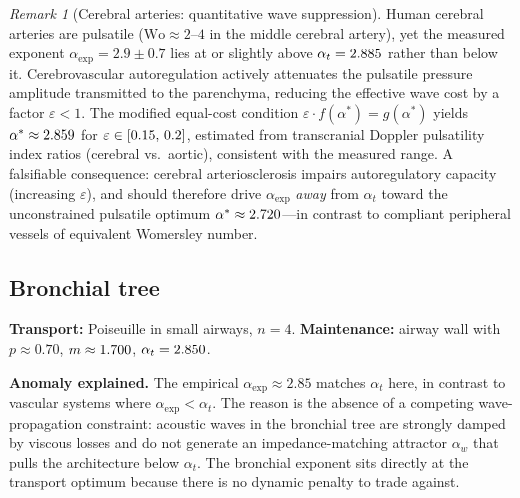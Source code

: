 \documentclass[11pt,a4paper]{article}
\theoremstyle{remark}
\newtheorem{remark}{Remark}
\begin{document}
\begin{remark}[Cerebral arteries: quantitative wave suppression]
\label{rem:cerebral}
Human cerebral arteries are pulsatile ($\mathrm{Wo} \approx 2$--$4$ in the
middle cerebral artery), yet the measured exponent $\alpha_{\exp} = 2.9 \pm 0.7$
\cite{rossitti1993} lies at or slightly above $\alpha_t = 2.885{}$ rather
than below it. Cerebrovascular autoregulation actively attenuates the pulsatile
pressure amplitude transmitted to the parenchyma, reducing the effective wave
cost by a factor $\varepsilon < 1$. The modified equal-cost condition
$\varepsilon \cdot f(\alpha^*) = g(\alpha^*)$
yields $\alpha^* \approx 2.859{}$ for
$\varepsilon \in [0.15{},\, 0.2{}]$,
estimated from transcranial Doppler pulsatility index ratios
(cerebral vs.\ aortic), consistent with the measured range.
A falsifiable consequence: cerebral arteriosclerosis impairs autoregulatory
capacity (increasing $\varepsilon$), and should therefore drive $\alpha_{\exp}$
\emph{away} from $\alpha_t$ toward the unconstrained pulsatile optimum
$\alpha^* \approx 2.720{}$---in contrast to compliant peripheral vessels
of equivalent Womersley number.
\end{remark}

\subsection{Bronchial tree}
\textbf{Transport:} Poiseuille in small airways, $n=4$. \textbf{Maintenance:} airway wall with $p \approx 0.70$, $m \approx 1.700{}$, $\alpha_t = 2.850{}$.

\noindent \textbf{Anomaly explained.} The empirical $\alpha_{\exp} \approx 2.85$ matches $\alpha_t$ here, in contrast to vascular systems where $\alpha_{\exp} < \alpha_t$. The reason is the absence of a competing wave-propagation constraint: acoustic waves in the bronchial tree are strongly damped by viscous losses and do not generate an impedance-matching attractor $\alpha_w$ that pulls the architecture below $\alpha_t$. The bronchial exponent sits directly at the transport optimum because there is no dynamic penalty to trade against.
\end{document}
